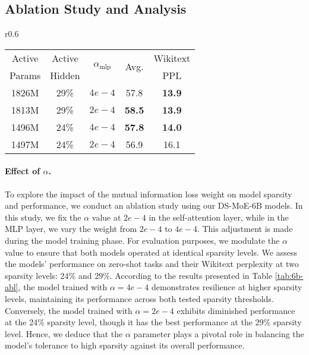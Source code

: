 \subsection{Ablation Study and Analysis}\label{sec:abl}

\begin{wraptable}{r}{0.6\textwidth}
    \centering
    \caption{Effect of Different $\alpha$ on our DS-MoE-6B model.}
    \begin{tabular}{cc|c|cc}
        \toprule
         Active & Active & \multirow{2}{*}{$\alpha_{\text{mlp}}$} & \multirow{2}{*}{Avg.} & Wikitext \\
         Params & Hidden & &  & PPL \\
        \midrule
        1826M & 29\% & $4e-4$ & 57.8 & \textbf{13.9} \\
        1813M & 29\% & $2e-4$ & \textbf{58.5} & \textbf{13.9} \\
        \midrule
        1496M & 24\% & $4e-4$ & \textbf{57.8} & \textbf{14.0} \\
        1497M & 24\% & $2e-4$ & 56.9 & 16.1 \\
        \bottomrule
    \end{tabular}
    \label{tab:6b-abl}
\end{wraptable}\paragraph{Effect of $\alpha$.} To explore the impact of the mutual information loss weight on model sparsity and performance, we conduct an ablation study using our DS-MoE-6B models. In this study, we fix the $\alpha$ value at $2e-4$ in the self-attention layer, while in the MLP layer, we vary the weight from $2e-4$ to $4e-4$. This adjustment is made during the model training phase. For evaluation purposes, we modulate the $\alpha$ value to ensure that both models operated at identical sparsity levels. We assess the models' performance on zero-shot tasks and their Wikitext perplexity at two sparsity levels: 24\% and 29\%. According to the results presented in Table \ref{tab:6b-abl}, the model trained with $\alpha=4e-4$ demonstrates resilience at higher sparsity levels, maintaining its performance across both tested sparsity thresholds. Conversely, the model trained with $\alpha=2e-4$ exhibits diminished performance at the 24\% sparsity level, though it has the best performance at the 29\% sparsity level. Hence, we deduce that the $\alpha$ parameter plays a pivotal role in balancing the model's tolerance to high sparsity against its overall performance.

